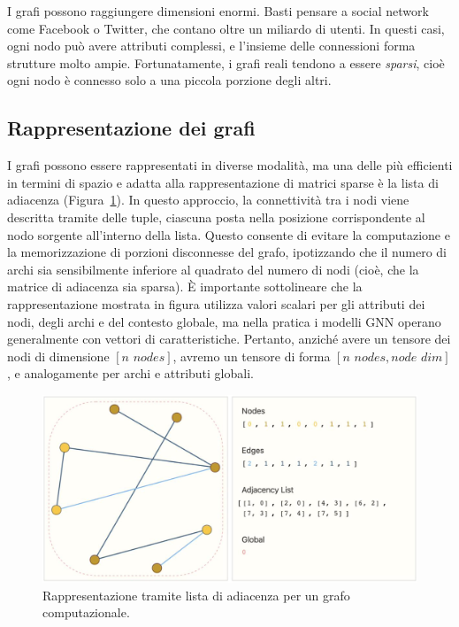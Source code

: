 I grafi possono raggiungere dimensioni enormi. Basti pensare a social network come Facebook o Twitter, che contano oltre un miliardo di utenti. In questi casi, ogni nodo può avere attributi complessi, e l’insieme delle connessioni forma strutture molto ampie. Fortunatamente, i grafi reali tendono a essere \textit{sparsi}, cioè ogni nodo è connesso solo a una piccola porzione degli altri.

\subsection{Rappresentazione dei grafi}

I grafi possono essere rappresentati in diverse modalità, ma una delle più efficienti in termini di spazio e adatta alla rappresentazione di matrici sparse è la lista di adiacenza (Figura~\ref{fig:GraphComp}). In questo approccio, la connettività tra i nodi viene descritta tramite delle tuple, ciascuna posta nella posizione corrispondente al nodo sorgente all'interno della lista. Questo consente di evitare la computazione e la memorizzazione di porzioni disconnesse del grafo, ipotizzando che il numero di archi sia sensibilmente inferiore al quadrato del numero di nodi (cioè, che la matrice di adiacenza sia sparsa). È importante sottolineare che la rappresentazione mostrata in figura utilizza valori scalari per gli attributi dei nodi, degli archi e del contesto globale, ma nella pratica i modelli GNN operano generalmente con vettori di caratteristiche. Pertanto, anziché avere un tensore dei nodi di dimensione $[\textit{n nodes}]$, avremo un tensore di forma $[\textit{n nodes}, \textit{node dim}]$, e analogamente per archi e attributi globali.

\begin{figure}
    \centering
    \includegraphics[width=\textwidth]{figure/ComputGraph.png}
    \caption{Rappresentazione tramite lista di adiacenza per un grafo computazionale.}
    \label{fig:GraphComp}
\end{figure}

